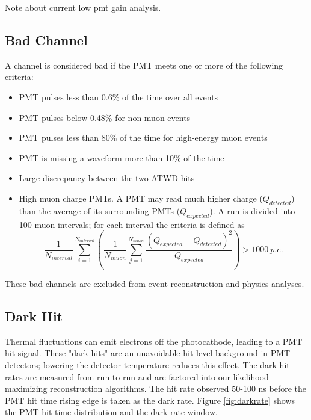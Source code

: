 Note about current low pmt gain analysis.

\subsection*{Bad Channel}
A channel is considered bad if the PMT meets one or more of the following criteria:
\begin{itemize}
	\item PMT pulses less than 0.6\% of the time over all events
	\item PMT pulses below 0.48\% for non-muon events
	\item PMT pulses less than 80\% of the time for high-energy muon events
	\item PMT is missing a waveform more than 10\% of the time
	\item Large discrepancy between the two ATWD hits
	\item High muon charge PMTs. A PMT may read much higher charge ($Q_{detected}$) than the average of its surrounding PMTs ($Q_{expected}$). A run is divided into 100 muon intervals; for each interval the criteria is defined as
	\[\frac{1}{N_{interval}}\sum_{i=1}^{N_{interval}}\left(\frac{1}{N_{muon}}\sum_{j=1}^{N_{muon}}\frac{(Q_{expected}-Q_{detected})^2}{Q_{expected}}\right)>1000\ p.e.\]
\end{itemize}
These bad channels are excluded from event reconstruction and physics analyses.

\subsection*{Dark Hit}
Thermal fluctuations can emit electrons off the photocathode, leading to a PMT hit signal. These "dark hits" are an unavoidable hit-level background in PMT detectors; lowering the detector temperature reduces this effect. The dark hit rates are measured from run to run and are factored into our likelihood-maximizing reconstruction algorithms. The hit rate observed 50-100 ns before the PMT hit time rising edge is taken as the dark rate. Figure \ref{fig:darkrate} shows the PMT hit time distribution and the dark rate window.

